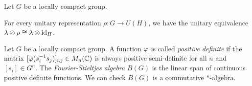 \documentclass{../../small}
\begin{document}
\begin{lem}
Let $G$ be a locally compact group.
\begin{parts}
\item For every unitary representation $\rho:G\to U(H)$, we have the unitary equivalence $\lambda\otimes\rho\cong\lambda\otimes\operatorname{id}_H$.
\end{parts}
\end{lem}


\begin{defn}
Let $G$ be a locally compact group.
A function $\varphi$ is called \emph{positive definite} if the matrix $[\varphi(s_i^{-1}s_j)]_{i,j}\in M_n(\mathbb{C})$ is always positive semi-definite for all $n$ and $[s_i]\in G^n$.
The \emph{Fourier-Stieltjes algebra} $B(G)$ is the linear span of continuous positive definite functions.
We can check $B(G)$ is a commutative $*$-algebra.
\end{defn}
\end{document}
